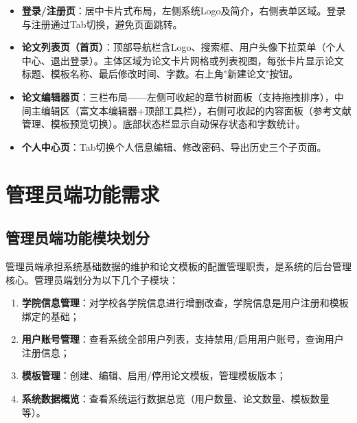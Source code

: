 \documentclass{../softeng}
\begin{document}
\begin{itemize}
    \item \textbf{登录/注册页}：居中卡片式布局，左侧系统Logo及简介，右侧表单区域。登录与注册通过Tab切换，避免页面跳转。
    \item \textbf{论文列表页（首页）}：顶部导航栏含Logo、搜索框、用户头像下拉菜单（个人中心、退出登录）。主体区域为论文卡片网格或列表视图，每张卡片显示论文标题、模板名称、最后修改时间、字数。右上角"新建论文"按钮。
    \item \textbf{论文编辑器页}：三栏布局——左侧可收起的章节树面板（支持拖拽排序），中间主编辑区（富文本编辑器+顶部工具栏），右侧可收起的内容面板（参考文献管理、模板预览切换）。底部状态栏显示自动保存状态和字数统计。
    \item \textbf{个人中心页}：Tab切换个人信息编辑、修改密码、导出历史三个子页面。
\end{itemize}

\section{管理员端功能需求}

\subsection{管理员端功能模块划分}

管理员端承担系统基础数据的维护和论文模板的配置管理职责，是系统的后台管理核心。管理员端划分为以下几个子模块：

\begin{enumerate}
    \item \textbf{学院信息管理}：对学校各学院信息进行增删改查，学院信息是用户注册和模板绑定的基础；
    \item \textbf{用户账号管理}：查看系统全部用户列表，支持禁用/启用用户账号，查询用户注册信息；
    \item \textbf{模板管理}：创建、编辑、启用/停用论文模板，管理模板版本；
    \item \textbf{系统数据概览}：查看系统运行数据总览（用户数量、论文数量、模板数量等）。
\end{enumerate}
\end{document}
